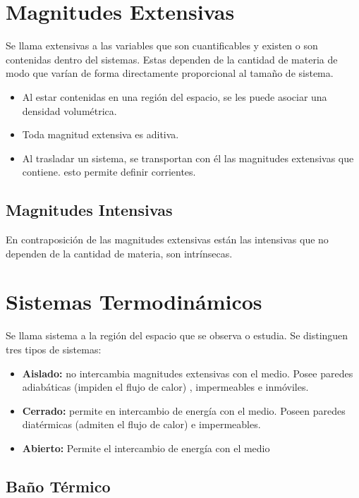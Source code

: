 \section{Magnitudes Extensivas}

Se llama extensivas a las variables que son cuantificables y existen o son contenidas dentro del sistemas. Estas dependen de la cantidad de materia de modo que varían de forma directamente proporcional al tamaño de sistema.

\begin{itemize}
    \item Al estar contenidas en una región del espacio, se les puede asociar una densidad volumétrica.
    \item Toda magnitud extensiva es aditiva.
    \item Al trasladar un sistema, se transportan con él las magnitudes extensivas que contiene. esto permite definir corrientes.
\end{itemize}

\subsection{Magnitudes Intensivas}

En contraposición de las magnitudes extensivas están las intensivas que no dependen de la cantidad de materia, son intrínsecas.

\section{Sistemas Termodinámicos}

Se llama sistema a la región del espacio que se observa o estudia. Se distinguen tres tipos de sistemas:

\begin{itemize}
    \item \textbf{Aislado:} no intercambia magnitudes extensivas con el medio. Posee paredes adiabáticas (impiden el flujo de calor) , impermeables e inmóviles.
    \item \textbf{Cerrado:} permite en intercambio de energía con el medio. Poseen paredes diatérmicas (admiten el flujo de calor) e impermeables.
    \item \textbf{Abierto:} Permite el intercambio de energía con el medio
\end{itemize}

\subsection{Baño Térmico}

